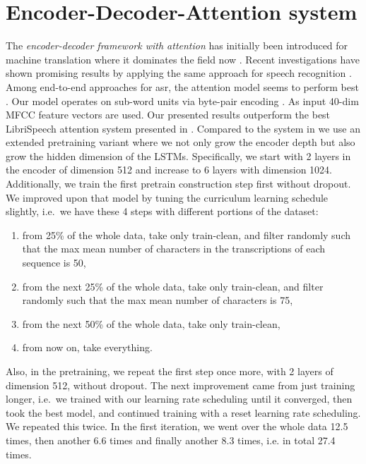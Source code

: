 \documentclass[a4paper]{article}
\begin{document}
\section{Encoder-Decoder-Attention system}
\label{sec:att}

The \emph{encoder-decoder framework with attention} has initially been introduced for machine translation
where it dominates the field now
\cite{bahdanau2014nmt,luong2015attentionmt,chen2018rnmtplus}.
Recent investigations have shown promising results by applying the same approach for
speech recognition \cite{
chan2016las, doetsch2016:bidir-dec-att, chiu2017sotaasratt, battenbergAsru17,
sabour2018ocd,
zeyer2018:asr-attention}.
Among end-to-end approaches for \ac{asr}, the attention model seems to perform best
\cite{zeyer2018:attanalysis}.
Our model operates on sub-word units via byte-pair encoding \cite{sennrich16bpe}.
As input 40-dim MFCC feature vectors are used.
Our presented results outperform the best LibriSpeech attention system presented in \cite{zeyer2018:attanalysis}.
Compared to the system in \cite{zeyer2018:attanalysis} we use an extended pretraining variant where we not only grow the encoder depth but also grow the hidden dimension of the LSTMs.
Specifically, we start with 2 layers in the encoder of dimension 512
and increase to 6 layers with dimension 1024.
Additionally, we train the first pretrain construction step first without dropout.
We improved upon that model by tuning the curriculum learning schedule slightly,
i.e.\ we have these 4 steps with different portions of the dataset:
\begin{enumerate}
\item from 25\% of the whole data, take only train-clean,
and filter randomly such that the max mean number of characters in the transcriptions of each sequence
is 50,
\item from the next 25\% of the whole data, take only train-clean,
and filter randomly such that the max mean number of characters is 75,
\item from the next 50\% of the whole data, take only train-clean,
\item from now on, take everything.
\end{enumerate}
Also, in the pretraining, we repeat the first step once more, with 2 layers of dimension 512, without dropout.
The next improvement came from just training longer,
i.e.\ we trained with our learning rate scheduling until it converged,
then took the best model, and continued training with a reset learning rate scheduling.
We repeated this twice.
In the first iteration, we went over the whole data 12.5 times, then another 6.6 times and finally another 8.3 times,
i.e. in total 27.4 times.
\end{document}

